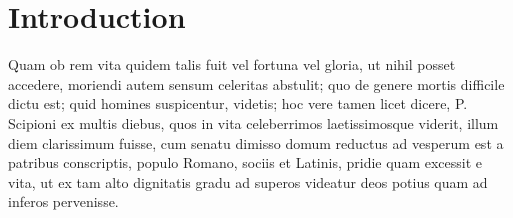 \documentclass{DChibouti}
\begin{document}

{{\footnotesize{
}}
\printnomenclature}


\chapter*{Introduction}

Quam ob rem vita quidem talis fuit vel fortuna vel gloria, ut nihil posset accedere, moriendi autem sensum celeritas abstulit; quo de genere mortis difficile dictu est; quid homines suspicentur, videtis; hoc vere tamen licet dicere, P. Scipioni ex multis diebus, quos in vita celeberrimos laetissimosque viderit, illum diem clarissimum fuisse, cum senatu dimisso domum reductus ad vesperum est a patribus conscriptis, populo Romano, sociis et Latinis, pridie quam excessit e vita, ut ex tam alto dignitatis gradu ad superos videatur deos potius quam ad inferos pervenisse.
\end{document}

